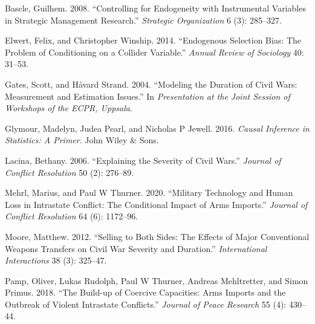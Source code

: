 \documentclass[
]{article}
\newlength{\cslhangindent}
\newlength{\cslentryspacingunit} %
\newenvironment{CSLReferences}[2] %
 {%
  \setlength{\parindent}{0pt}
  \ifodd #1
  \let\oldpar\par
  \def\par{\hangindent=\cslhangindent\oldpar}
  \fi
  \setlength{\parskip}{#2\cslentryspacingunit}
 }%
 {}
\begin{document}
\hypertarget{refs}{}
\begin{CSLReferences}{1}{0}
\leavevmode{}%
Bascle, Guilhem. 2008. {``Controlling for Endogeneity with Instrumental
Variables in Strategic Management Research.''} \emph{Strategic
Organization} 6 (3): 285--327.

\leavevmode{}%
Elwert, Felix, and Christopher Winship. 2014. {``Endogenous Selection
Bias: The Problem of Conditioning on a Collider Variable.''}
\emph{Annual Review of Sociology} 40: 31--53.

\leavevmode{}%
Gates, Scott, and Håvard Strand. 2004. {``Modeling the Duration of Civil
Wars: Measurement and Estimation Issues.''} In \emph{Presentation at the
Joint Session of Workshops of the ECPR, Uppsala}.

\leavevmode{}%
Glymour, Madelyn, Judea Pearl, and Nicholas P Jewell. 2016. \emph{Causal
Inference in Statistics: A Primer}. John Wiley \& Sons.

\leavevmode{}%
Lacina, Bethany. 2006. {``Explaining the Severity of Civil Wars.''}
\emph{Journal of Conflict Resolution} 50 (2): 276--89.

\leavevmode{}%
Mehrl, Marius, and Paul W Thurner. 2020. {``Military Technology and
Human Loss in Intrastate Conflict: The Conditional Impact of Arms
Imports.''} \emph{Journal of Conflict Resolution} 64 (6): 1172--96.

\leavevmode{}%
Moore, Matthew. 2012. {``Selling to Both Sides: The Effects of Major
Conventional Weapons Transfers on Civil War Severity and Duration.''}
\emph{International Interactions} 38 (3): 325--47.

\leavevmode{}%
Pamp, Oliver, Lukas Rudolph, Paul W Thurner, Andreas Mehltretter, and
Simon Primus. 2018. {``The Build-up of Coercive Capacities: Arms Imports
and the Outbreak of Violent Intrastate Conflicts.''} \emph{Journal of
Peace Research} 55 (4): 430--44.

\end{CSLReferences}
\end{document}
